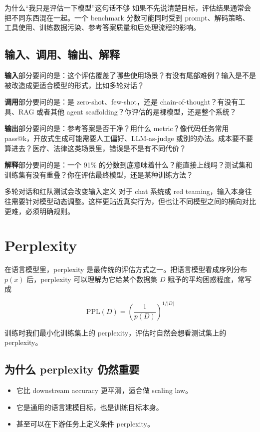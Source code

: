 \documentclass[a4paper]{article}
\begin{document}
\begin{warningbox}{为什么``我只是评估一下模型''这句话不够}
如果不先说清楚目标，评估结果通常会把不同东西混在一起。一个 benchmark 分数可能同时受到 prompt、解码策略、工具使用、训练数据污染、参考答案质量和后处理流程的影响。
\end{warningbox}

\subsection{输入、调用、输出、解释}

\textbf{输入}部分要问的是：这个评估覆盖了哪些使用场景？有没有尾部难例？输入是不是被改造成更适合模型的形式，比如多轮对话？

\textbf{调用}部分要问的是：是 zero-shot、few-shot，还是 chain-of-thought？有没有工具、RAG 或者其他 agent scaffolding？你评估的是裸模型，还是整个系统？

\textbf{输出}部分要问的是：参考答案是否干净？用什么 metric？像代码任务常用 pass@k，开放式生成可能需要人工偏好、LLM-as-judge 或别的办法。成本要不要算进去？医疗、法律这类场景里，错误是不是有不同代价？

\textbf{解释}部分要问的是：一个 91\% 的分数到底意味着什么？能直接上线吗？测试集和训练集有没有重叠？你在评估最终模型，还是某种训练方法？

\begin{importantbox}{多轮对话和红队测试会改变输入定义}
对于 chat 系统或 red teaming，输入本身往往需要针对模型动态调整。这样更贴近真实行为，但也让不同模型之间的横向对比更难，必须明确规则。
\end{importantbox}

\section{Perplexity}

在语言模型里，perplexity 是最传统的评估方式之一。把语言模型看成序列分布 $p(x)$ 后，perplexity 可以理解为它给某个数据集 $D$ 赋予的平均困惑程度，常写成

\[
\mathrm{PPL}(D) = \left(\frac{1}{p(D)}\right)^{1/|D|}
\]

训练时我们最小化训练集上的 perplexity，评估时自然会想看测试集上的 perplexity。

\subsection{为什么 perplexity 仍然重要}

\begin{itemize}
    \item 它比 downstream accuracy 更平滑，适合做 scaling law。
    \item 它是通用的语言建模目标，也是训练目标本身。
    \item 甚至可以在下游任务上定义条件 perplexity。
\end{itemize}
\end{document}
